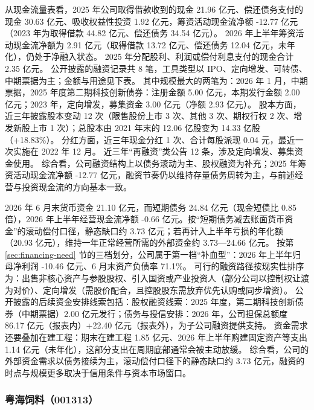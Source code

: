  从现金流量表看，2025 年公司取得借款收到的现金 21.96 亿元、偿还债务支付的现金 30.63 亿元、吸收权益性投资 1.92 亿元，筹资活动现金流净额 -12.77 亿元（2023 年为取得借款 44.82 亿元、偿还债务 34.54 亿元）。 2026 年上半年筹资活动现金流净额为 2.91 亿元（取得借款 13.72 亿元、偿还债务 12.04 亿元，未年化），仍处于净融入状态。 2025 年分配股利、利润或偿付利息支付的现金合计 2.35 亿元。 公开披露的融资记录共 8 笔，工具类型以 IPO、定向增发、可转债、中期票据为主；金额与用途见下表。 其中规模最大的两笔为：2026 年 1 月，中期票据，2025 年度第二期科技创新债券：注册金额 5.00 亿元，本期发行金额 2.00 亿元；2023 年，定向增发，募集资金 3.00 亿元（净额 2.93 亿元）。 股本方面，近三年披露股本变动 12 次（限售股份上市 3 次、其他 3 次、期权行权 2 次、增发新股上市 1 次）；总股本由 2021 年末的 12.06 亿股变为 14.33 亿股（+18.83\%）。 分红方面，近三年现金分红 1 次、合计每股派现 0.04 元，最近一次实施在 2022 年 12 月。 近三年“再融资”类公告 12 条，涉及定向增发、募集资金使用。 综合看，公司融资结构上以债务滚动为主、股权融资为补充；2025 年筹资活动现金流净额 -12.77 亿元，融资节奏仍以维持存量债务周转为主，与前述经营与投资现金流的方向基本一致。

 2026 年 6 月末货币资金 21.10 亿元，而短期债务 24.84 亿元（现金短债比 0.85 倍），2026 年上半年经营现金流净额 -0.66 亿元。按“短期债务减去账面货币资金”的滚动偿付口径，静态缺口约 3.73 亿元；若再计入上半年亏损的年化额（20.93 亿元），维持一年正常经营所需的外部资金约 3.73---24.66 亿元。 按第 \ref{sec:financing-need} 节的三档划分，公司属于第一档“补血型”：2026 年上半年归母净利润 -10.46 亿元、6 月末资产负债率 71.1\%。 可行的融资路径按现实性排序为：出售非核心资产与参股股权、引入国资或产业投资人（部分公司以控制权让渡为对价）、定向增发（需股价配合，且控股股东需放弃优先认购或同步增资）。 公开披露的后续资金安排线索包括：股权融资线索：2025 年度，第二期科技创新债券（中期票据）2.00 亿元发行；债务与授信安排：2026 年，公司担保总额度 86.17 亿元（报表内）+22.40 亿元（报表外），为子公司融资提供支持。 资金需求还要叠加在建工程：期末在建工程 1.85 亿元、2026 年上半年购建固定资产等支出 1.14 亿元（未年化），这部分支出在周期底部通常会被主动放缓。 综合看，公司的外部资金需求以债务接续为主，滚动偿付口径下的静态缺口约 3.73 亿元，融资的时点与规模更多取决于信用条件与资本市场窗口。




\subsubsection{粤海饲料（001313）}
\label{co:001313}

